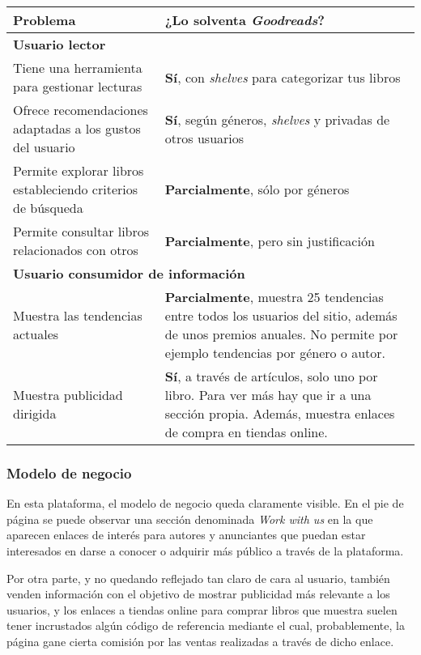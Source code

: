 \begin{table}[H]
    \begin{tabularx}{\linewidth}{|X|X|}
        \hline
        \textbf{Problema} & \textbf{¿Lo solventa \textit{Goodreads}?} \\
        \hline
        \hline
        \multicolumn{2}{|l|}{\textbf{Usuario lector}} \\
        \hline
        Tiene una herramienta para gestionar lecturas     & \textbf{Sí}, con \textit{shelves} para categorizar tus libros \\ 
        \hline
        Ofrece recomendaciones adaptadas a los gustos del usuario & \textbf{Sí}, según géneros, \textit{shelves} y privadas de otros usuarios \\ 
        \hline
        Permite explorar libros estableciendo criterios de búsqueda   & \textbf{Parcialmente}, sólo por géneros \\ 
        \hline
        Permite consultar libros relacionados con otros   & \textbf{Parcialmente}, pero sin justificación \\ 
        \hline
        \multicolumn{2}{|l|}{ \textbf{Usuario consumidor de información}} \\
        \hline
        Muestra las tendencias actuales     & \textbf{Parcialmente}, muestra 25 tendencias entre todos los usuarios del sitio, además de unos premios anuales. No permite por ejemplo tendencias por género o autor. \\ 
        \hline
        Muestra publicidad dirigida     & \textbf{Sí}, a través de artículos, solo uno por libro. Para ver más hay que ir a una sección propia. Además, muestra enlaces de compra en tiendas online. \\ 
        \hline
    \end{tabularx}
\end{table}

\subsubsection{Modelo de negocio}

En esta plataforma, el modelo de negocio queda claramente visible. En el pie de página se puede observar una sección denominada \textit{Work with us} en la que aparecen enlaces de interés para autores y anunciantes que puedan estar interesados en darse a conocer o adquirir más público a través de la plataforma.

Por otra parte, y no quedando reflejado tan claro de cara al usuario, también venden información con el objetivo de mostrar publicidad más relevante a los usuarios, y los enlaces a tiendas online para comprar libros que muestra suelen tener incrustados algún código de referencia mediante el cual, probablemente, la página gane cierta comisión por las ventas realizadas a través de dicho enlace.

